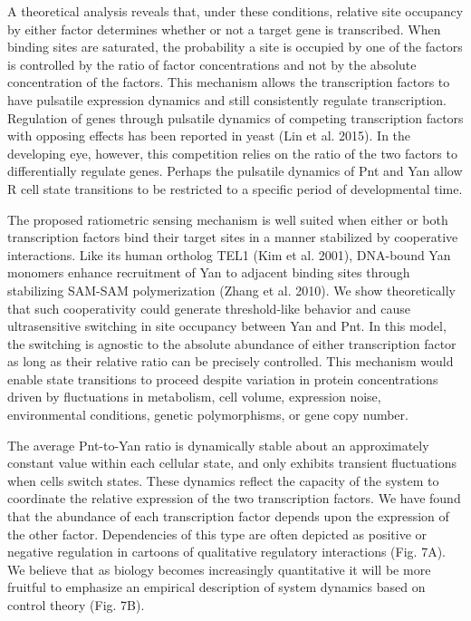 A theoretical analysis reveals that, under these conditions, relative site occupancy by either factor determines whether or not a target gene is transcribed. When binding sites are saturated, the probability a site is occupied by one of the factors is controlled by the ratio of factor concentrations and not by the absolute concentration of the factors. This mechanism allows the transcription factors to have pulsatile expression dynamics and still consistently regulate transcription. Regulation of genes through pulsatile dynamics of competing transcription factors with opposing effects has been reported in yeast (Lin et al. 2015). In the developing eye, however, this competition relies on the ratio of the two factors to differentially regulate genes. Perhaps the pulsatile dynamics of Pnt and Yan allow R cell state transitions to be restricted to a specific period of developmental time.

The proposed ratiometric sensing mechanism is well suited when either or both transcription factors bind their target sites in a manner stabilized by cooperative interactions. Like its human ortholog TEL1 (Kim et al. 2001), DNA-bound Yan monomers enhance recruitment of Yan to adjacent binding sites through stabilizing SAM-SAM polymerization (Zhang et al. 2010). We show theoretically that such cooperativity could generate threshold-like behavior and cause ultrasensitive switching in site occupancy between Yan and Pnt. In this model, the switching is agnostic to the absolute abundance of either transcription factor as long as their relative ratio can be precisely controlled. This mechanism would enable state transitions to proceed despite variation in protein concentrations driven by fluctuations in metabolism, cell volume, expression noise, environmental conditions, genetic polymorphisms, or gene copy number.

The average Pnt-to-Yan ratio is dynamically stable about an approximately constant value within each cellular state, and only exhibits transient fluctuations when cells switch states. These dynamics reflect the capacity of the system to coordinate the relative expression of the two transcription factors. We have found that the abundance of each transcription factor depends upon the expression of the other factor. Dependencies of this type are often depicted as positive or negative regulation in cartoons of qualitative regulatory interactions (Fig. 7A). We believe that as biology becomes increasingly quantitative it will be more fruitful to emphasize an empirical description of system dynamics based on control theory (Fig. 7B).

